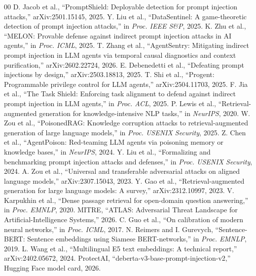 \documentclass[conference]{IEEEtran}
\begin{document}
\begin{thebibliography}{00}
 D. Jacob et al., ``PromptShield: Deployable detection for prompt injection attacks,'' arXiv:2501.15145, 2025.
 Y. Liu et al., ``DataSentinel: A game-theoretic detection of prompt injection attacks,'' in \textit{Proc. IEEE S\&P}, 2025.
 K. Zhu et al., ``MELON: Provable defense against indirect prompt injection attacks in AI agents,'' in \textit{Proc. ICML}, 2025.
 T. Zhang et al., ``AgentSentry: Mitigating indirect prompt injection in LLM agents via temporal causal diagnostics and context purification,'' arXiv:2602.22724, 2026.
 E. Debenedetti et al., ``Defeating prompt injections by design,'' arXiv:2503.18813, 2025.
 T. Shi et al., ``Progent: Programmable privilege control for LLM agents,'' arXiv:2504.11703, 2025.
 F. Jia et al., ``The Task Shield: Enforcing task alignment to defend against indirect prompt injection in LLM agents,'' in \textit{Proc. ACL}, 2025.
 P. Lewis et al., ``Retrieval-augmented generation for knowledge-intensive NLP tasks,'' in \textit{NeurIPS}, 2020.
 W. Zou et al., ``PoisonedRAG: Knowledge corruption attacks to retrieval-augmented generation of large language models,'' in \textit{Proc. USENIX Security}, 2025.
 Z. Chen et al., ``AgentPoison: Red-teaming LLM agents via poisoning memory or knowledge bases,'' in \textit{NeurIPS}, 2024.
 Y. Liu et al., ``Formalizing and benchmarking prompt injection attacks and defenses,'' in \textit{Proc. USENIX Security}, 2024.
 A. Zou et al., ``Universal and transferable adversarial attacks on aligned language models,'' arXiv:2307.15043, 2023.
 Y. Gao et al., ``Retrieval-augmented generation for large language models: A survey,'' arXiv:2312.10997, 2023.
 V. Karpukhin et al., ``Dense passage retrieval for open-domain question answering,'' in \textit{Proc. EMNLP}, 2020.
 MITRE, ``ATLAS: Adversarial Threat Landscape for Artificial-Intelligence Systems,'' 2026.
 C. Guo et al., ``On calibration of modern neural networks,'' in \textit{Proc. ICML}, 2017.
 N. Reimers and I. Gurevych, ``Sentence-BERT: Sentence embeddings using Siamese BERT-networks,'' in \textit{Proc. EMNLP}, 2019.
 L. Wang et al., ``Multilingual E5 text embeddings: A technical report,'' arXiv:2402.05672, 2024.
 ProtectAI, ``deberta-v3-base-prompt-injection-v2,'' Hugging Face model card, 2026.
\end{thebibliography}
\end{document}

